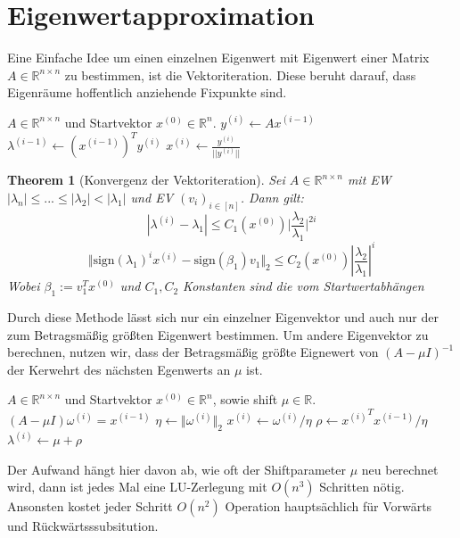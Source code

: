 \documentclass[10pt,a4paper]{article}
\newtheorem{theorem}{Theorem}
\begin{document}
	\section{Eigenwertapproximation}
	Eine Einfache Idee um einen einzelnen Eigenwert mit Eigenwert einer Matrix $A\in \mathbb{R}^{n\times n}$ zu bestimmen, ist die Vektoriteration. Diese beruht darauf, dass Eigenräume hoffentlich anziehende Fixpunkte sind.
	\begin{algorithm}
		\caption{Vektoriteration}
		\begin{algorithmic}
			\Require $A\in \mathbb{R}^{n\times n}$ und Startvektor $x^{(0)}\in \mathbb{R}^n$.
				\State $y^{(i)} \leftarrow Ax^{(i-1)}$
				\State $\lambda^(i-1) \leftarrow (x^(i-1))^Ty^{(i)}$
				\State $x^{(i)} \leftarrow \frac{y^{(i)}}{||y^{(i)}||}$
			\EndFor
		\end{algorithmic}
	\end{algorithm}
	\begin{theorem}[Konvergenz der Vektoriteration]
		Sei $A\in \mathbb{R}^{n \times n}$ mit EW $|\lambda_n| \leq ... \leq |\lambda_2| < |\lambda_1|$ und EV $(v_i)_{i\in [n]}$. Dann gilt:
		$$|\lambda^{(i)}-\lambda_1| \leq C_1(x^{(0)})\vert\frac{\lambda_2}{\lambda_1}\vert^{2i}$$
		$$\Vert\text{sign}(\lambda_1)^ix^{(i)} - \text{sign}(\beta_1)v_1\Vert_2 \leq C_2(x^{(0)})|\frac{\lambda_2}{\lambda_1}|^i$$
		Wobei $\beta_1 := v^T_1x^{(0)}$ und $C_1, C_2$ Konstanten sind die vom Startwertabhängen
	\end{theorem}
	Durch diese Methode lässt sich nur ein einzelner Eigenvektor und auch nur der zum Betragsmäßig größten Eigenwert bestimmen. Um andere Eigenvektor zu berechnen, nutzen wir, dass der Betragsmäßig größte Eignewert von $(A-\mu I)^{-1}$ der Kerwehrt des nächsten Egenwerts an $\mu$ ist.
	\begin{algorithm}[H]
		\caption{Inverse Vektoriteration}
		\begin{algorithmic}
			\Require $A\in \mathbb{R}^{n\times n}$ und Startvektor $x^{(0)}\in \mathbb{R}^n$, sowie shift $\mu \in \mathbb{R}$.
			\For{$i=1,2,...$}
			\State $(A-\mu I)\omega^{(i)} = x^{(i-1)}$
			\State $\eta \leftarrow \Vert \omega^{(i)}\Vert_2$
			\State $x^{(i)} \leftarrow \omega^{(i)}/\eta$
			\State $\rho \leftarrow {x^{(i)}}^Tx^{(i-1)}/\eta$
			\State $\lambda^{(i)} \leftarrow \mu + \rho$
			\EndFor
		\end{algorithmic}
	\end{algorithm}
	Der Aufwand hängt hier davon ab, wie oft der Shiftparameter $\mu$ neu berechnet wird, dann ist jedes Mal eine LU-Zerlegung mit $O(n^3)$ Schritten nötig. Ansonsten kostet jeder Schritt $O(n^2)$ Operation hauptsächlich für Vorwärts und Rückwärtsssubsitution. \\
\end{document}
